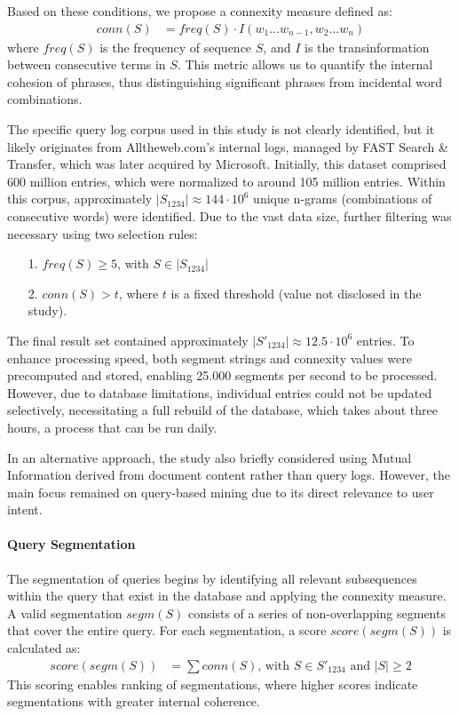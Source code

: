 Based on these conditions, we propose a connexity measure defined as:
\begin{align*}
conn(S) &= freq(S) \cdot I(w_1...w_{n-1},w_2...w_n)
\end{align*}
where $freq(S)$ is the frequency of sequence $S$, and $I$ is the transinformation between consecutive terms in $S$. This metric allows us to quantify the internal cohesion of phrases, thus distinguishing significant phrases from incidental word combinations.

The specific query log corpus used in this study is not clearly identified, but it likely originates from Alltheweb.com's internal logs, managed by FAST Search \& Transfer, which was later acquired by Microsoft. Initially, this dataset comprised 600 million entries, which were normalized to around 105 million entries. Within this corpus, approximately $|S_{1234}| \approx 144 \cdot 10^6$ unique n-grams (combinations of consecutive words) were identified. Due to the vast data size, further filtering was necessary using two selection rules:
\begin{enumerate}
\item[1.] $freq(S) \ge 5$, with $S \in |S_{1234}|$
\item[2.] $conn(S) > t$, where $t$ is a fixed threshold (value not disclosed in the study).
\end{enumerate}

The final result set contained approximately $|S'_{1234}| \approx 12.5 \cdot 10^6$ entries. To enhance processing speed, both segment strings and connexity values were precomputed and stored, enabling 25.000 segments per second to be processed. However, due to database limitations, individual entries could not be updated selectively, necessitating a full rebuild of the database, which takes about three hours, a process that can be run daily.

In an alternative approach, the study also briefly considered using Mutual Information derived from document content rather than query logs. However, the main focus remained on query-based mining due to its direct relevance to user intent.

\paragraph*{Query Segmentation}
The segmentation of queries begins by identifying all relevant subsequences within the query that exist in the database and applying the connexity measure. A valid segmentation $segm(S)$ consists of a series of non-overlapping segments that cover the entire query. For each segmentation, a score $score(segm(S))$ is calculated as:
\begin{align*}
score(segm(S)) &= \sum conn(S) \text{, with } S \in S'_{1234} \text{ and } |S| \ge 2
\end{align*}
This scoring enables ranking of segmentations, where higher scores indicate segmentations with greater internal coherence.


